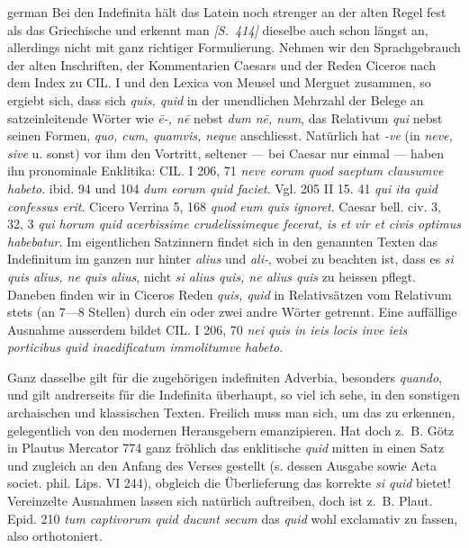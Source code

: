 \begin{otherlanguage*}{german}
Bei den Indefinita hält das Latein noch strenger an der alten Regel fest als das Griechische und erkennt man \hypertarget{p414}{\emph{[S.~414]}}\label{p414} dieselbe auch schon längst an, allerdings nicht mit ganz richtiger Formulierung. Nehmen wir den Sprachgebrauch der alten Inschriften, der Kommentarien Caesars und der Reden Ciceros nach dem Index zu CIL. I und den Lexica von Meusel und Merguet zusammen, so ergiebt sich, dass sich \emph{quis, quid} in der unendlichen Mehrzahl der Belege an satzeinleitende Wörter wie \emph{ē-, nē} nebst \emph{dum nē, num}, das Relativum \emph{qui} nebst seinen Formen, \emph{quo, cum, quamvis, neque} anschliesst. Natürlich hat \emph{-ve} (in \emph{neve, sive} u. sonst) vor ihm den Vortritt, seltener — bei Caesar nur einmal — haben ihn pronominale Enklitika: CIL. I 206, 71 \emph{neve eorum quod saeptum clausumve habeto}. ibid. 94 und 104 \emph{dum eorum quid faciet}. Vgl. 205 II 15. 41 \emph{qui ita quid confessus erit}. Cicero Verrina 5, 168 \emph{quod eum quis ignoret}. Caesar bell. civ. 3, 32, 3 \emph{qui horum quid acerbissime crudelissimeque fecerat, is et vir et civis optimus habebatur}. Im eigentlichen Satzinnern findet sich in den genannten Texten das Indefinitum im ganzen nur hinter \emph{alius} und \emph{ali-}, wobei zu beachten ist, dass es \emph{si quis alius, ne quis alius}, nicht \emph{si alius quis, ne alius quis} zu heissen pflegt. Daneben finden wir in Ciceros Reden \emph{quis, quid} in Relativsätzen vom Relativum stets (an 7—8 Stellen) durch ein oder zwei andre Wörter getrennt. Eine auffällige Ausnahme ausserdem bildet CIL. I 206, 70 \emph{nei quis in ieis locis inve ieis porticibus quid inaedificatum immolitumve habeto}.

Ganz dasselbe gilt für die zugehörigen indefiniten Adverbia, besonders \emph{quando}, und gilt andrerseits für die Indefinita überhaupt, so viel ich sehe, in den sonstigen archaischen und klassischen Texten. Freilich muss man sich, um das zu erkennen, gelegentlich von den modernen Herausgebern emanzipieren. Hat doch z.~B. Götz in Plautus Mercator 774 ganz fröhlich das enklitische \emph{quid} mitten in einen Satz und zugleich an den Anfang des Verses gestellt (s. dessen Ausgabe sowie Acta societ. phil. Lips. VI 244), obgleich die Überlieferung das korrekte \emph{si quid} bietet! Vereinzelte Ausnahmen lassen sich natürlich auftreiben, doch ist z.~B. Plaut. Epid. 210 \emph{tum captivorum quid ducunt secum} das \emph{quid} wohl exclamativ zu fassen, also orthotoniert.


\end{otherlanguage*}
